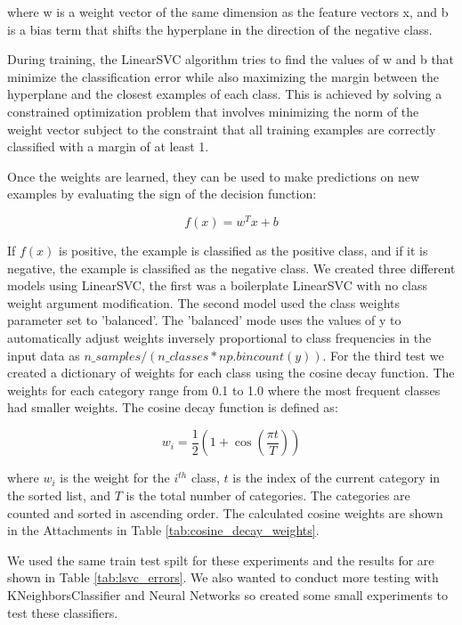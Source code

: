 where w is a weight vector of the same dimension as the feature vectors x, and b is a bias term that shifts the hyperplane in the direction of the negative class.

During training, the LinearSVC algorithm tries to find the values of w and b that minimize the classification error while also maximizing the margin between the hyperplane and the closest examples of each class. This is achieved by solving a constrained optimization problem that involves minimizing the norm of the weight vector subject to the constraint that all training examples are correctly classified with a margin of at least 1.

Once the weights are learned, they can be used to make predictions on new examples by evaluating the sign of the decision function:

\begin{equation}
f(x) = w^T x + b
\end{equation}

If $f(x)$ is positive, the example is classified as the positive class, and if it is negative, the example is classified as the negative class. We created three different models using LinearSVC, the first was a boilerplate LinearSVC with no class weight argument modification. The second model used the class weights parameter set to 'balanced'. The 'balanced' mode uses the values of y to automatically adjust weights inversely proportional to class frequencies in the input data as $n\_samples / (n\_classes * np.bincount(y))$. For the third test we created a dictionary of weights for each class using the cosine decay function. The weights for each category range from 0.1 to 1.0 where the most frequent classes had smaller weights. The cosine decay function is defined as:

\begin{equation}
    w_i = \frac{1}{2} \left(1 + \cos \left(\frac{\pi t}{T}\right)\right)
\label{eq:cosine_decay}
\end{equation}

where $w_i$ is the weight for the $i^{th}$ class, $t$ is the index of the current category in the sorted list, and $T$ is the total number of categories. The categories are counted and sorted in ascending order. The calculated cosine weights are shown in the Attachments in Table \ref{tab:cosine_decay_weights}.

We used the same train test spilt for these experiments and the results for are shown in Table \ref{tab:lsvc_errors}. We also wanted to conduct more testing with KNeighborsClassifier and Neural Networks so created some small experiments to test these classifiers.

